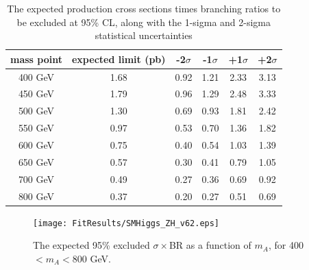 \begin{table}
    \center
    \caption{The expected production cross sections times branching ratios
        to be excluded at 95\% CL, along with the 1-sigma and 2-sigma statistical uncertainties 
    \label{tab:limitSensitivity}}
    \begin{tabular}{ c c c c c c } \hline \hline
        mass point & expected limit (pb) & -2$\sigma$ & -1$\sigma$ & +1$\sigma$ & +2$\sigma$ \\ \hline 
        400 GeV & 1.68 & 0.92 & 1.21 & 2.33 & 3.13 \\
        450 GeV & 1.79 & 0.96 & 1.29 & 2.48 & 3.33 \\
        500 GeV & 1.30 & 0.69 & 0.93 & 1.81 & 2.42 \\
        550 GeV & 0.97 & 0.53 & 0.70 & 1.36 & 1.82 \\
        600 GeV & 0.75 & 0.40 & 0.54 & 1.03 & 1.39 \\
        650 GeV & 0.57 & 0.30 & 0.41 & 0.79 & 1.05 \\
        700 GeV & 0.49 & 0.27 & 0.36 & 0.69 & 0.92 \\
        800 GeV & 0.37 & 0.20 & 0.27 & 0.51 & 0.69 \\


       \hline
    \end{tabular}
\end{table} 




\begin{figure}[hbt]
\center
\texttt{[image: FitResults/SMHiggs\_ZH\_v62.eps]}
\caption{The expected 95\% excluded $\sigma\times$BR as a function of $m_A$, 
for 400$<m_A<$800 GeV.
\label{fig:limitSensitivity}}
\end{figure}

